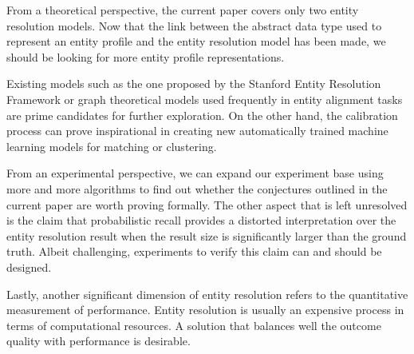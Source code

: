 \documentclass[journal]{IEEEtran}
\begin{document}
    From a theoretical perspective, the current paper covers only two entity
    resolution models.
    Now that the link between the abstract data type used to represent an entity
    profile and the entity resolution model has been made, we should be looking
    for more entity profile representations.

    Existing models such as the one proposed by the Stanford Entity Resolution
    Framework\cite{Ben2009Swoosh} or graph theoretical models used frequently in
    entity alignment tasks are prime candidates for further exploration.
    On the other hand, the calibration process can prove inspirational in
    creating new automatically trained machine learning models for matching or
    clustering.

    From an experimental perspective, we can expand our experiment base using
    more and more algorithms to find out whether the conjectures outlined in
    the current paper are worth proving formally.
    The other aspect that is left unresolved is the claim that probabilistic
    recall provides a distorted interpretation over the entity resolution result
    when the result size is significantly larger than the ground truth.
    Albeit challenging, experiments to verify this claim can and should be
    designed.

    Lastly, another significant dimension of entity resolution refers to the
    quantitative measurement of performance.
    Entity resolution is usually an expensive process in terms of computational
    resources.
    A solution that balances well the outcome quality with performance is
    desirable.

    \balance
    
    
\end{document}
